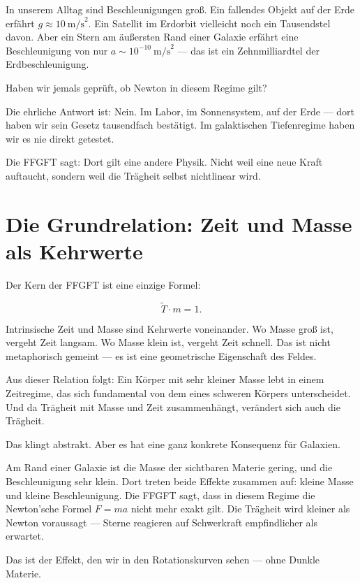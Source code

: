 \documentclass[11pt,oneside]{book}
\begin{document}
In unserem Alltag sind Beschleunigungen groß. Ein fallendes
Objekt auf der Erde erfährt $g \approx 10~\text{m/s}^2$.
Ein Satellit im Erdorbit vielleicht noch ein Tausendstel davon.
Aber ein Stern am äußersten Rand einer Galaxie erfährt eine
Beschleunigung von nur
$a \sim 10^{-10}~\text{m/s}^2$ — das ist ein
Zehnmilliardtel der Erdbeschleunigung.

Haben wir jemals geprüft, ob Newton in diesem Regime gilt?

Die ehrliche Antwort ist: Nein. Im Labor, im Sonnensystem, auf
der Erde — dort haben wir sein Gesetz tausendfach bestätigt.
Im galaktischen Tiefenregime haben wir es nie direkt getestet.

Die FFGFT sagt: Dort gilt eine andere Physik. Nicht weil eine
neue Kraft auftaucht, sondern weil die Trägheit selbst
nichtlinear wird.

\chapter{Die Grundrelation: Zeit und Masse als Kehrwerte}

Der Kern der FFGFT ist eine einzige Formel:

\[
  \tilde{T} \cdot m = 1 .
\]

Intrinsische Zeit und Masse sind Kehrwerte voneinander.
Wo Masse groß ist, vergeht Zeit langsam. Wo Masse klein ist,
vergeht Zeit schnell. Das ist nicht metaphorisch gemeint —
es ist eine geometrische Eigenschaft des Feldes.

Aus dieser Relation folgt: Ein Körper mit sehr kleiner Masse
lebt in einem Zeitregime, das sich fundamental von dem eines
schweren Körpers unterscheidet. Und da Trägheit mit Masse und
Zeit zusammenhängt, verändert sich auch die Trägheit.

Das klingt abstrakt. Aber es hat eine ganz konkrete Konsequenz
für Galaxien.

Am Rand einer Galaxie ist die Masse der sichtbaren Materie
gering, und die Beschleunigung sehr klein. Dort treten beide
Effekte zusammen auf: kleine Masse und kleine Beschleunigung.
Die FFGFT sagt, dass in diesem Regime die Newton'sche Formel
$F = ma$ nicht mehr exakt gilt. Die Trägheit wird kleiner als
Newton voraussagt — Sterne reagieren auf Schwerkraft
empfindlicher als erwartet.

Das ist der Effekt, den wir in den Rotationskurven sehen —
ohne Dunkle Materie.
\end{document}
